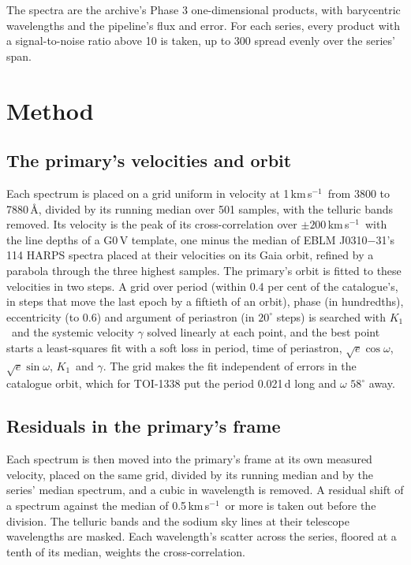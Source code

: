 \documentclass[3p,11pt]{elsarticle}
\newcommand{\kms}{km\,s$^{-1}$}
\newcommand{\Kone}{$K_1$}
\begin{document}
The spectra are the archive's Phase 3 one-dimensional products, with barycentric wavelengths and
the pipeline's flux and error. For each series, every product with a signal-to-noise ratio above
10 is taken, up to 300 spread evenly over the series' span.

\section{Method}\label{sec:method}

\subsection{The primary's velocities and orbit}

Each spectrum is placed on a grid uniform in velocity at 1\,\kms\ from 3800 to 7880\,\AA,
divided by its running median over 501 samples, with the telluric bands removed. Its velocity is
the peak of its cross-correlation over $\pm 200$\,\kms\ with the line depths of a G0\,V template,
one minus the median of EBLM J0310$-$31's 114 HARPS spectra placed at their velocities on its
Gaia orbit, refined by a parabola through the three highest samples. The primary's orbit is fitted
to these velocities in two steps. A grid over period (within 0.4 per cent of the catalogue's, in
steps that move the last epoch by a fiftieth of an orbit), phase (in hundredths), eccentricity (to
0.6) and argument of periastron (in $20^\circ$ steps) is searched with \Kone\ and the systemic
velocity $\gamma$ solved linearly at each point, and the best point starts a least-squares fit with
a soft loss in period, time of periastron, $\sqrt{e}\cos\omega$, $\sqrt{e}\sin\omega$, \Kone\ and
$\gamma$. The grid makes the fit independent of errors in the catalogue orbit, which for
TOI-1338 put the period 0.021\,d long and $\omega$ $58^\circ$ away.

\subsection{Residuals in the primary's frame}

Each spectrum is then moved into the primary's frame at its own measured velocity, placed on the
same grid, divided by its running median and by the series' median spectrum, and a cubic in
wavelength is removed. A residual shift of a spectrum against the median of 0.5\,\kms\ or more is
taken out before the division. The telluric bands and the sodium sky lines at their telescope
wavelengths are masked. Each wavelength's scatter across the series, floored at a tenth of its
median, weights the cross-correlation.
\end{document}
